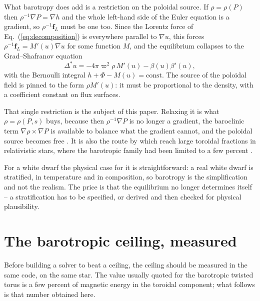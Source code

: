 \documentclass{aa}
\begin{document}
What barotropy does add is a restriction on the poloidal source. If
$\rho = \rho(P)$ then $\rho^{-1}\nabla P = \nabla h$ and the whole
left-hand side of the Euler equation is a gradient, so
$\rho^{-1}\mathbf{f}_L$ must be one too. Since the Lorentz force of
Eq.~(\ref{eq:decomposition}) is everywhere parallel to $\nabla u$, this
forces $\rho^{-1}\mathbf{f}_L = M'(u)\nabla u$ for some function $M$, and
the equilibrium collapses to the Grad--Shafranov equation
\citep{grad1958,shafranov1966}
\begin{equation}
\Delta^\ast u = -4\pi\varpi^2 \rho\, M'(u) - \beta(u)\beta'(u),
\label{eq:gs}
\end{equation}
with the Bernoulli integral $h + \Phi - M(u) = \mathrm{const}$. The
source of the poloidal field is pinned to the form $\rho M'(u)$: it must
be proportional to the density, with a coefficient constant on flux
surfaces.

That single restriction is the subject of this paper. Relaxing it is what
$\rho = \rho(P,s)$ buys, because then $\rho^{-1}\nabla P$ is no longer a
gradient, the baroclinic term $\nabla\rho\times\nabla P$ is available to
balance what the gradient cannot, and the poloidal source becomes free
\citep{mastrano2011,armaza2015}. It is also the route by which
\citet{ciolfi2013} reach large toroidal fractions in relativistic stars,
where the barotropic family had been limited to a few percent
\citep{lander2009,ciolfi2009,duez2010}.

For a white dwarf the physical case for it is straightforward: a real
white dwarf is stratified, in temperature and in composition, so
barotropy is the simplification and not the realism. The price is that
the equilibrium no longer determines itself -- a stratification has to be
specified, or derived and then checked for physical plausibility.


\section{The barotropic ceiling, measured}
\label{sec:ceiling}

Before building a solver to beat a ceiling, the ceiling should be
measured in the same code, on the same star. The value usually quoted for
the barotropic twisted torus is a few percent of magnetic energy in the
toroidal component; what follows is that number obtained here.
\end{document}
